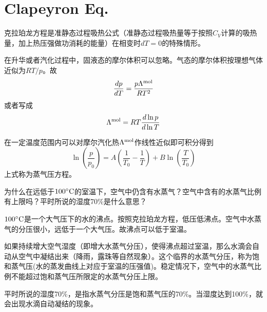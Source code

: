 \documentclass[CJK]{beamer}
\begin{document}
\section{Clapeyron Eq.}
\setcounter{chap}{5}
\setcounter{problem}{0}

\begin{frame}
  \bch
  \emini
  克拉珀龙方程是准静态过程吸热公式（准静态过程吸热量等于按照$C_V$计算的吸热量，加上热压强做功消耗的能量）在相变时$dT=0$的特殊情形。
  \emini
  
  \ech
\end{frame}

\begin{frame}
  \bch
  在升华或者汽化过程中，固液态的摩尔体积可以忽略。气态的摩尔体积按理想气体近似为$RT/p$。故
  $$ \frac{dp}{dT} = \frac{p\Lambda^{\rm mol}}{RT^2}$$
  或者写成
{\blue  $$ \Lambda^{\rm mol} = RT \frac{d \ln p}{d \ln T} $$}
  \ech
\end{frame}


\begin{frame}
  \bch
  在一定温度范围内可以对摩尔汽化热$\Lambda^{\rm mol}$作线性近似即可积分得到
  $$\ln\left(\frac{p}{p_0}\right) = A\left(\frac{1}{T_0} - \frac{1}{T}\right) + B \ln\left(\frac{T}{T_0}\right)$$
  上式称为蒸气压方程。
  \ech
\end{frame}

\begin{frame}
  \chtitle{\proid (\sone)}
  \bch
  为什么在远低于$100^\circ \mathrm{C}$的室温下，空气中仍含有水蒸气？空气中含有的水蒸气比例有上限吗？平时所说的湿度70\%是什么意思？
  \ech
\end{frame}


\begin{frame}
  \bch
  $100^\circ \mathrm{C}$是一个大气压下的水的沸点。按照克拉珀龙方程，低压低沸点。空气中水蒸气的分压很小，远低于一个大气压。故沸点可以低于室温。

  \skipline

  如果持续增大空气湿度（即增大水蒸气分压），使得沸点超过室温，那么水滴会自动从空气中凝结出来（降雨，露珠等自然现象）。这个临界的水蒸气分压，称为饱和蒸气压(水的蒸发曲线上对应于室温的压强值)。稳定情况下，空气中的水蒸气比例不能超过饱和蒸气压所限定的水蒸气分压上限。

  \skipline
  
  平时所说的湿度70\%，是指水蒸气分压是饱和蒸气压的70\%。当湿度达到100\%，就会出现水滴自动凝结的现象。
  \ech
\end{frame}
\end{document}
